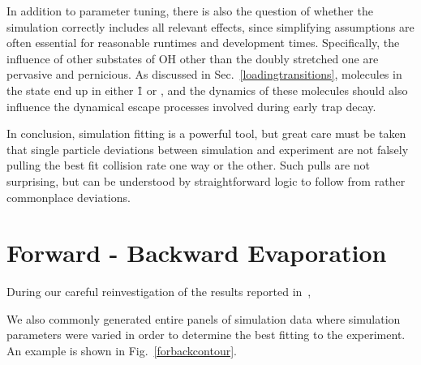 
In addition to parameter tuning, there is also the question of whether the simulation correctly includes all relevant effects, since simplifying assumptions are often essential for reasonable runtimes and development times.
Specifically, the influence of other substates of OH other than the doubly stretched one are pervasive and pernicious.
As discussed in Sec.~\ref{loadingtransitions}, molecules in the  state end up in either \f1 or , and the dynamics of these molecules should also influence the dynamical escape processes involved during early trap decay.

In conclusion, simulation fitting is a powerful tool, but great care must be taken that single particle deviations between simulation and experiment are not falsely pulling the best fit collision rate one way or the other.
Such pulls are not surprising, but can be understood by straightforward logic to follow from rather commonplace deviations.

\section{Forward - Backward Evaporation}

During our careful reinvestigation of the results reported in~\cite{Stuhl2012evap}, 

We also commonly generated entire panels of simulation data where simulation parameters were varied in order to determine the best fitting to the experiment.
An example is shown in Fig.~\ref{forbackcontour}.


